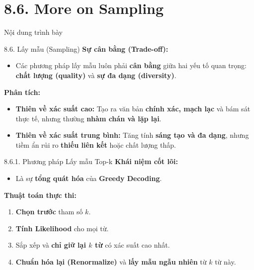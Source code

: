 \section{8.6. More on Sampling}


\begin{frame}{Nội dung trình bày}
	\tableofcontents[currentsection]
\end{frame}

\begin{frame}{8.6. Lấy mẫu (Sampling)}
	\textbf{Sự cân bằng (Trade-off):}
	\begin{itemize}
		\item Các phương pháp lấy mẫu luôn phải \textbf{cân bằng} giữa hai yếu tố quan trọng: \textbf{chất lượng (quality)} và \textbf{sự đa dạng (diversity)}.
	\end{itemize}
	
	\vspace{0.5cm}
	
	\textbf{Phân tích:}
	\begin{itemize}
		\item \textbf{Thiên về xác suất cao:} Tạo ra văn bản \textbf{chính xác, mạch lạc} và bám sát thực tế, nhưng thường \textbf{nhàm chán và lặp lại}.
		\item \textbf{Thiên về xác suất trung bình:} Tăng tính \textbf{sáng tạo và đa dạng}, nhưng tiềm ẩn rủi ro \textbf{thiếu liên kết} hoặc chất lượng thấp.
	\end{itemize}
	
\end{frame}

\begin{frame}{8.6.1. Phương pháp Lấy mẫu Top-k}
	\textbf{Khái niệm cốt lõi:}
	\begin{itemize}
		\item Là sự \textbf{tổng quát hóa} của \textbf{Greedy Decoding}.
	\end{itemize}
	
	\vspace{0.4cm}
	\textbf{Thuật toán thực thi:}
	\begin{enumerate}
		\item \textbf{Chọn trước} tham số $k$.
		\item \textbf{Tính Likelihood} cho mọi từ.
		\item Sắp xếp và \textbf{chỉ giữ lại $k$ từ} có xác suất cao nhất.
		\item \textbf{Chuẩn hóa lại (Renormalize)} và \textbf{lấy mẫu ngẫu nhiên} từ $k$ từ này.
	\end{enumerate}
\end{frame}

